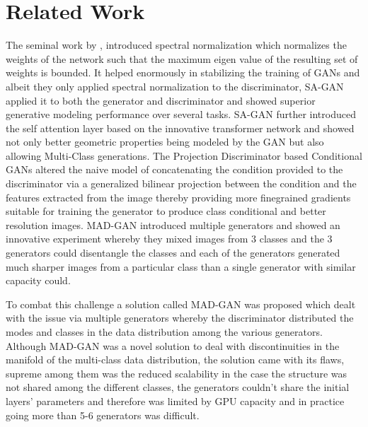 \section{Related Work}
The seminal work by \cite{miyato2018spectral}, introduced spectral normalization which normalizes the weights of the network such that the maximum eigen value of the resulting set of weights is bounded. It helped enormously in stabilizing the training of GANs and albeit they only applied spectral normalization to the discriminator, SA-GAN \cite{zhang2018self} applied it to both the generator and discriminator and showed superior generative modeling performance over several tasks. SA-GAN further introduced the self attention layer based on the innovative transformer network and showed not only better geometric properties being modeled by the GAN but also allowing Multi-Class generations. The Projection Discriminator \cite{miyato2018cgans} based Conditional GANs altered the naive model of concatenating the condition provided to the discriminator via a generalized bilinear projection between the condition and the features extracted from the image thereby providing more finegrained gradients suitable for training the generator to produce class conditional and better resolution images. MAD-GAN \cite{ghosh2017multi} introduced multiple generators and showed an innovative experiment whereby they mixed images from 3 classes and the 3 generators could disentangle the classes and each of the generators generated much sharper images from a particular class than a single generator with similar capacity could. 

To combat this challenge a solution called MAD-GAN \cite{ghosh2017multi} was proposed which dealt with the issue via multiple generators whereby the discriminator distributed the modes and classes in the data distribution among the various generators. 
Although MAD-GAN was a novel solution to deal with discontinuities in the manifold of the multi-class data distribution, the solution came with its flaws, supreme among them was the reduced scalability in the case the structure was not shared among the different classes, the generators couldn't share the initial layers' parameters and therefore was limited by GPU capacity and in practice going more than 5-6 generators was difficult. 

